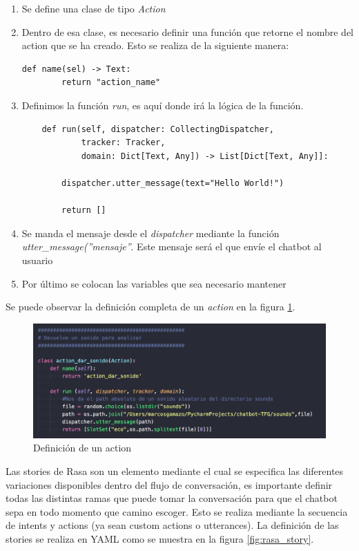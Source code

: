 \begin{enumerate}
    \item Se define una clase de tipo \textit{Action}
    \item Dentro de esa clase, es necesario definir una función que retorne el nombre del action que se ha creado. Esto se realiza de la siguiente manera: 
    \begin{lstlisting}[style=Python]
    def name(sel) -> Text:
        return "action_name"
    \end{lstlisting}
    \item Definimos la función \textit{run}, es aquí donde irá la lógica de la función.
    \begin{lstlisting}
    def run(self, dispatcher: CollectingDispatcher,
            tracker: Tracker,
            domain: Dict[Text, Any]) -> List[Dict[Text, Any]]:

        dispatcher.utter_message(text="Hello World!")

        return []
    \end{lstlisting}
    \item Se manda el mensaje desde el \textit{dispatcher} mediante la función \textit{utter\_message(''mensaje''}. Este mensaje será el que envíe el chatbot al usuario
    \item Por último se colocan las variables que sea necesario mantener
\end{enumerate}

Se puede observar la definición completa de un \textit{action} en la figura \ref{fig:rasa_action}.

\begin{figure}[H]
    \centering
    \includegraphics[width=\textwidth]{include/capturas/RasaAction.png}
    \caption{Definición de un action}
    \label{fig:rasa_action}
\end{figure}


Las stories de Rasa son un elemento mediante el cual se especifica las diferentes variaciones disponibles dentro del flujo de conversación, es importante definir todas las distintas ramas que puede tomar la conversación para que el chatbot sepa en todo momento que camino escoger. Esto se realiza mediante la secuencia de intents y actions (ya sean custom actions o utterances). La definición de las stories se realiza en YAML como se muestra en la figura \ref{fig:rasa_story}.

